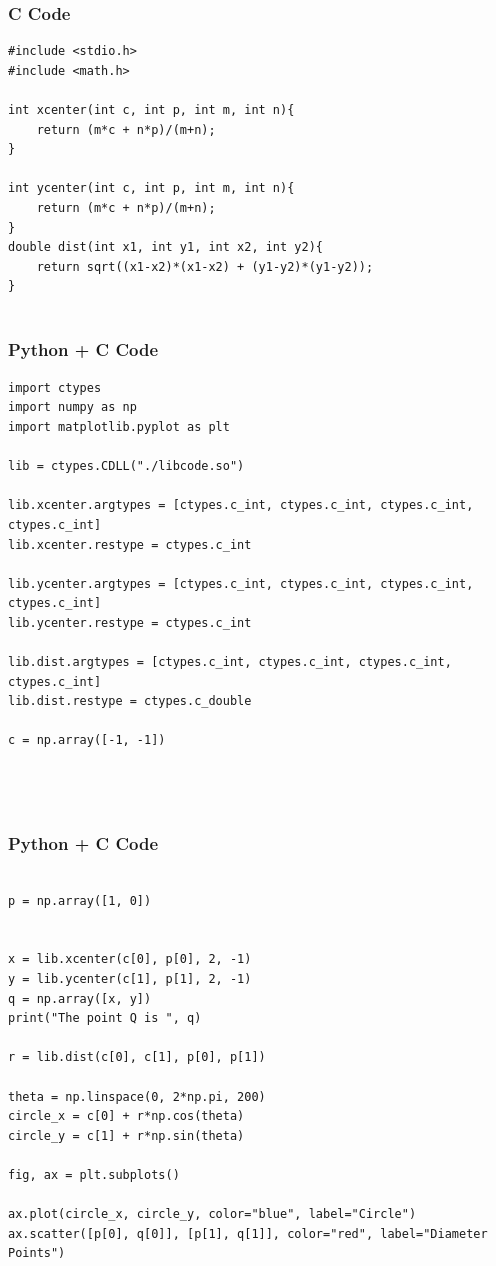 \documentclass{beamer}
\begin{document}
\begin{frame}[fragile]
    \frametitle{C Code}
    \begin{lstlisting}
#include <stdio.h>
#include <math.h>

int xcenter(int c, int p, int m, int n){
    return (m*c + n*p)/(m+n);
}

int ycenter(int c, int p, int m, int n){
    return (m*c + n*p)/(m+n);
}
double dist(int x1, int y1, int x2, int y2){
    return sqrt((x1-x2)*(x1-x2) + (y1-y2)*(y1-y2));
}


    \end{lstlisting}
\end{frame}
\begin{frame}[fragile]
    \frametitle{Python + C Code}
    \begin{lstlisting}
import ctypes
import numpy as np 
import matplotlib.pyplot as plt

lib = ctypes.CDLL("./libcode.so")

lib.xcenter.argtypes = [ctypes.c_int, ctypes.c_int, ctypes.c_int, ctypes.c_int]
lib.xcenter.restype = ctypes.c_int

lib.ycenter.argtypes = [ctypes.c_int, ctypes.c_int, ctypes.c_int, ctypes.c_int]
lib.ycenter.restype = ctypes.c_int

lib.dist.argtypes = [ctypes.c_int, ctypes.c_int, ctypes.c_int, ctypes.c_int]
lib.dist.restype = ctypes.c_double

c = np.array([-1, -1])




    \end{lstlisting}
\end{frame}
\begin{frame}[fragile]
    \frametitle{Python + C Code}
    \begin{lstlisting}

p = np.array([1, 0])


x = lib.xcenter(c[0], p[0], 2, -1)
y = lib.ycenter(c[1], p[1], 2, -1)
q = np.array([x, y])
print("The point Q is ", q)

r = lib.dist(c[0], c[1], p[0], p[1])

theta = np.linspace(0, 2*np.pi, 200)
circle_x = c[0] + r*np.cos(theta)
circle_y = c[1] + r*np.sin(theta)

fig, ax = plt.subplots()

ax.plot(circle_x, circle_y, color="blue", label="Circle")
ax.scatter([p[0], q[0]], [p[1], q[1]], color="red", label="Diameter Points")


    \end{lstlisting}
\end{frame}
\end{document}
